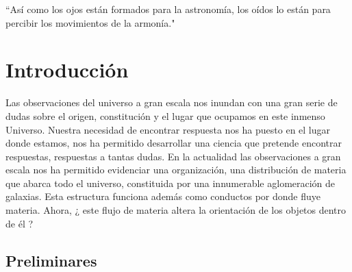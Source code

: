\begin{savequote}[60mm]
``Así como los ojos están formados para la astronomía, los oídos lo están para percibir los movimientos de la armonía."
\end{savequote}




\chapter{Introducción}
\label{cha:Introduction}

Las observaciones del universo a gran escala nos inundan con una gran serie de dudas sobre el origen, constitución y el lugar que ocupamos en este inmenso Universo. Nuestra necesidad de encontrar respuesta nos ha puesto en el lugar donde estamos, nos ha permitido desarrollar una ciencia que pretende encontrar respuestas, respuestas a tantas dudas. En la actualidad las observaciones a gran escala nos ha permitido evidenciar una organización, una distribución de materia que abarca todo el universo, constituida por una innumerable aglomeración de galaxias. Esta estructura  funciona además como conductos por donde fluye materia. Ahora, ¿ este flujo de materia altera la orientación de los objetos dentro de él ?
 
\section{Preliminares }
\label{sec: prelimenares}
 
